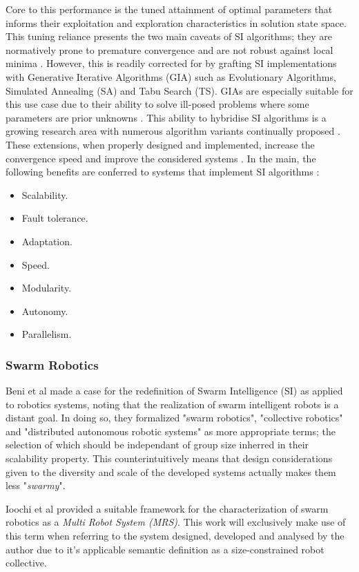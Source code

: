\documentclass{report}
\begin{document}
Core to this performance is the tuned attainment of optimal parameters that informs their exploitation and exploration characteristics in solution state space. This tuning reliance presents the two main caveats of SI algorithms; they are normatively prone to premature convergence and are not robust against local minima \cite{Cuevas2013}. However, this is readily corrected for by grafting SI implementations with Generative Iterative Algorithms (GIA) such as Evolutionary Algorithms, Simulated Annealing (SA) and Tabu Search (TS). GIAs are especially suitable for this use case due to their ability to solve ill-posed problems where some parameters are prior unknowns \cite{Youssef2001}. This ability to hybridise SI algorithms is a growing research area with numerous algorithm variants continually proposed \cite{Tran2016} \cite{Coello2006} \cite{Phung2017}. These extensions, when properly designed and implemented, increase the convergence speed and improve the considered systems \cite{Tran2016}. In the main, the following benefits are conferred to systems that implement SI algorithms \cite{Cuevas2013}:
\begin{itemize}
	\item Scalability.
	\item Fault tolerance.
	\item Adaptation.
	\item Speed.
	\item Modularity.
	\item Autonomy.
	\item Parallelism.
\end{itemize}

\subsubsection{Swarm Robotics}
Beni et al \cite{Beni2005a} made a case for the redefinition of Swarm Intelligence (SI) as applied to robotics systems, noting that the realization of swarm intelligent robots is a distant goal. In doing so, they formalized "swarm robotics", "collective robotics" and "distributed autonomous robotic systems" as more appropriate terms; the selection of which should be independant of group size inherred in their scalability property. This counterintuitively means that design considerations given to the diversity and scale of the developed systems actually makes them less "\textit{swarmy}".

Ioochi et al \cite{Iocchi2001} provided a suitable framework for the characterization of swarm robotics as a \textit{Multi Robot System (MRS)}. This work will exclusively make use of this term when referring to the system designed, developed and analysed by the author due to it's applicable semantic definition as a size-constrained robot collective.
\end{document}
